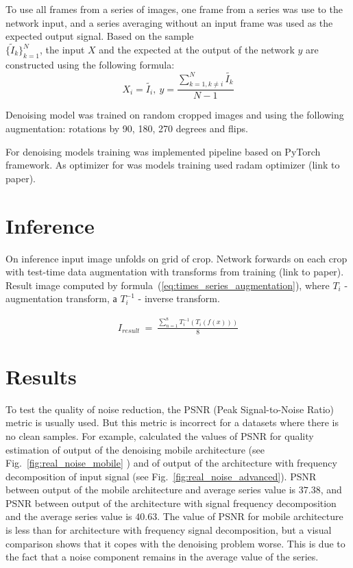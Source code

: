 \documentclass[runningheads]{llncs}
\begin{document}
To use all frames from a series of images, one frame from a series was use to the network input, and a series averaging without an input frame was used as the expected output signal. Based on the sample \\$\{\tilde{I} _k\} _ {k=1}^{N}$, the input $X$ and the expected at the output of the network $y$ are constructed using the following formula:
\begin{equation}\label{eq:dataset}
X_i = \tilde{I_i},\ y = \frac{\sum_{k=1, k \ne i}^{N}\tilde{I_k}}{N - 1}
\end{equation}

Denoising model was trained on random cropped images and using the following augmentation: rotations by 90, 180, 270 degrees and flips.

For denoising models training was implemented pipeline based on PyTorch framework. As optimizer for was models training used radam optimizer (link to paper).

\section{Inference}
On inference input image unfolds on grid of crop. Network forwards on each crop with test-time data augmentation with transforms from training (link to paper). Result image computed by formula~(\ref{eq:times_series_augmentation}), where $T_{i}$ - augmentation transform, а $T_{i}^{-1}$ - inverse transform.

\begin{eqnarray}\label{eq:times_series_augmentation}
I_{result}\ =\ \frac{\sum_{n=1}^{8} T_{i}^{-1}(T_{i}(f(x)))}{8}
\end{eqnarray}


\section{Results}
To test the quality of noise reduction, the PSNR (Peak Signal-to-Noise Ratio) metric is usually used. But this metric is incorrect for a datasets where there is no clean samples. For example, calculated the values of PSNR for quality estimation of output of the denoising mobile architecture (see Fig.~\ref{fig:real_noise_mobile} ) and of output of the architecture with frequency decomposition of input signal (see Fig.~\ref{fig:real_noise_advanced}). PSNR between output of the mobile architecture and average series value is $37.38$, and PSNR between output of the architecture with signal frequency decomposition and the average series value is $40.63$. The value of PSNR for mobile architecture is less than for architecture with frequency signal decomposition, but a visual comparison shows that it copes with the denoising problem worse. This is due to the fact that a noise component remains in the average value of the series.
\end{document}
